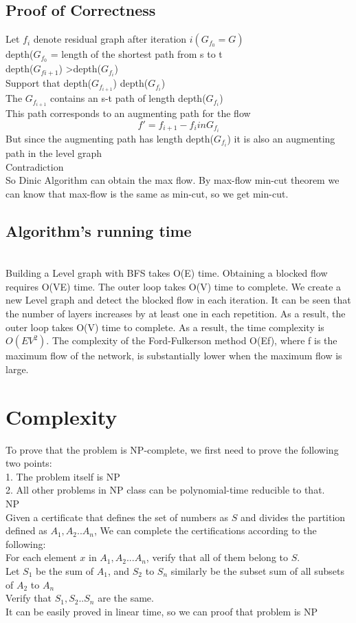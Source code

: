 \documentclass{article}
\begin{document}
\subsection{Proof of Correctness}
Let $f_i$ denote residual graph after iteration $i (G_{f_0} = G)$\\
depth($G_{f_0}$ = length of the shortest path from s to t\\
depth($G_{f{i+1}}$) \textgreater depth($G_{f_i}$)\\
Support that depth($G_{f_{i+1}}$) \leq depth($G_{f_i}$)\\
The $G_{f_{i+1}}$ contains an s-t path of length \leq depth($G_{f_i}$)\\
This path corresponds to an augmenting path for the flow
$$
f' = f_{i+1} - f_i in G_{f_i}
$$
But since the augmenting path has length depth($G_{f_i}$) it is also an augmenting path in the level graph\\
Contradiction\\
So Dinic Algorithm can obtain the max flow. By max-flow min-cut theorem we can know that max-flow is the same as min-cut, so we get min-cut.

\subsection{Algorithm's running time}\\
Building a Level graph with BFS takes O(E) time. Obtaining a blocked flow requires O(VE) time. The outer loop takes O(V) time to complete. We create a new Level graph and detect the blocked flow in each iteration. It can be seen that the number of layers increases by at least one in each repetition. As a result, the outer loop takes O(V) time to complete. As a result, the time complexity is $O(EV^2)$. The complexity of the Ford-Fulkerson method O(Ef), where f is the maximum flow of the network, is substantially lower when the maximum flow is large.
\clearpage
\section{Complexity}
To prove that the problem is NP-complete, we first need to prove the following two points:\\
1. The problem itself is NP \\
2. All other problems in NP class can be polynomial-time reducible to that.\\

NP\\
Given a certificate that defines the set of numbers as $S$ and divides the partition defined as $A_1, A_2. . A_n$, We can complete the certifications according to the following:\\
For each element $x$ in $A_1, A_2...A_n$, verify that all of them belong to $S$.\\
Let $S_1$ be the sum of $A_1$, and $S_2$ to $S_n$ similarly be the subset sum of all subsets of $A_2$ to $A_n$\\
Verify that $S_1, S_2..S_n$ are the same.\\
It can be easily proved in linear time, so we can proof that problem is NP
\end{document}
